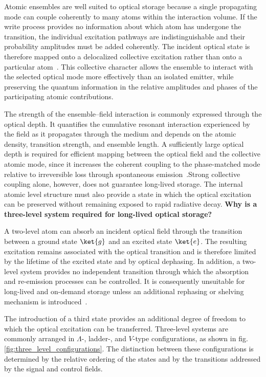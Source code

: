 Atomic ensembles are well suited to optical storage because a single propagating mode can couple coherently to many atoms within the interaction volume. If the write process provides no information about which atom has undergone the transition, the individual excitation pathways are indistinguishable and their probability amplitudes must be added coherently. The incident optical state is therefore mapped onto a delocalized collective excitation rather than onto a particular atom~\cite{Lqcwaealo_DuanEtAl_2001,QmfpDp_FleischhauerEtAl_2002,JiangEtAl_2016}. This collective character allows the ensemble to interact with the selected optical mode more effectively than an isolated emitter, while preserving the quantum information in the relative amplitudes and phases of the participating atomic contributions.

The strength of the ensemble--field interaction is commonly expressed through the optical depth. It quantifies the cumulative resonant interaction experienced by the field as it propagates through the medium and depends on the atomic density, transition strength, and ensemble length. A sufficiently large optical depth is required for efficient mapping between the optical field and the collective atomic mode, since it increases the coherent coupling to the phase-matched mode relative to irreversible loss through spontaneous emission~\cite{QmfpDp_FleischhauerEtAl_2002,JiangEtAl_2016}.Strong collective coupling alone, however, does not guarantee long-lived storage. The internal atomic level structure must also provide a state in which the optical excitation can be preserved without remaining exposed to rapid radiative decay.
\noindent\textbf{Why is a three-level system required for long-lived optical storage?}

A two-level atom can absorb an incident optical field through the transition between a ground state $\ket{g}$ and an excited state $\ket{e}$. The resulting excitation remains associated with the optical transition and is therefore limited by the lifetime of the excited state and by optical dephasing. In addition, a two-level system provides no independent transition through which the absorption and re-emission processes can be controlled. It is consequently unsuitable for long-lived and on-demand storage unless an additional rephasing or shelving mechanism is introduced~\cite{Oqm_LvovskyEtAl_2009,Qmeaara_HeshamiEtAl_2016}.

The introduction of a third state provides an additional degree of freedom to which the optical excitation can be transferred. Three-level systems are commonly arranged in $\Lambda$-, ladder-, and $V$-type configurations, as shown in fig. \ref{fig:three_level_configurations}. The distinction between these configurations is determined by the relative ordering of the states and by the transitions addressed by the signal and control fields.

